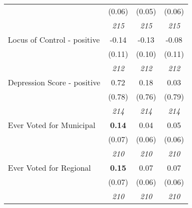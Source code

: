\begin{tabular}{l c c c}
& (0.06) & (0.05) & (0.06) \\
& \textit{ 215 } & \textit{ 215 } & \textit{ 215 } \\
Locus of Control - positive & -0.14 & -0.13 & -0.08 \\
& (0.11) & (0.10) & (0.11) \\
& \textit{ 212 } & \textit{ 212 } & \textit{ 212 } \\
Depression Score - positive & 0.72 & 0.18 & 0.03 \\
& (0.78) & (0.76) & (0.79) \\
& \textit{ 214 } & \textit{ 214 } & \textit{ 214 } \\
Ever Voted for Municipal & \textbf{ 0.14 } & 0.04 & 0.05 \\
& (0.07) & (0.06) & (0.06) \\
& \textit{ 210 } & \textit{ 210 } & \textit{ 210 } \\
Ever Voted for Regional & \textbf{ 0.15 } & 0.07 & 0.07 \\
& (0.07) & (0.06) & (0.06) \\
& \textit{ 210 } & \textit{ 210 } & \textit{ 210 } \\
\bottomrule
\end{tabular}
